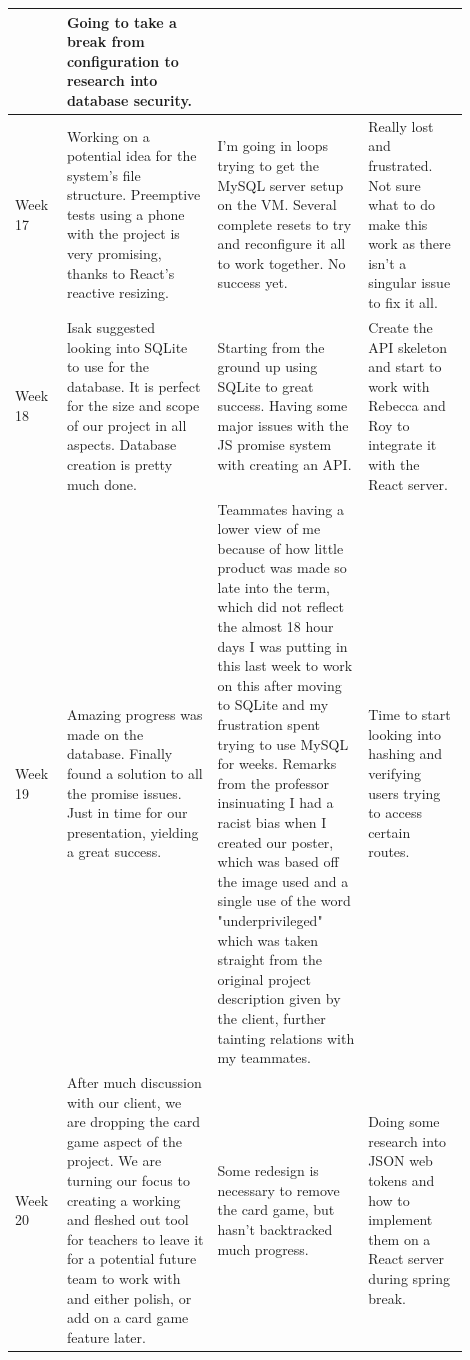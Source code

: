 \documentclass[draftclsnofoot,10pt,onecolumn]{IEEEtran}
\begin{document}
\begin{longtable}{p{0.1\linewidth}p{0.3\linewidth}p{0.3\linewidth}p{0.2\linewidth}}
            & Going to take a break from configuration to research into database security.\\
            \hline
            Week 17
            & Working on a potential idea for the system's file structure. Preemptive tests using a phone with the project is very promising, thanks to React's reactive resizing.
            & I'm going in loops trying to get the MySQL server setup on the VM. Several complete resets to try and reconfigure it all to work together. No success yet.
            & Really lost and frustrated. Not sure what to do make this work as there isn't a singular issue to fix it all. \\
            \hline
            Week 18
            & Isak suggested looking into SQLite to use for the database. It is perfect for the size and scope of our project in all aspects. Database creation is pretty much done.
            & Starting from the ground up using SQLite to great success. Having some major issues with the JS promise system with creating an API.
            & Create the API skeleton and start to work with Rebecca and Roy to integrate it with the React server. \\
            \hline
            Week 19
            & Amazing progress was made on the database. Finally found a solution to all the promise issues. Just in time for our presentation, yielding a great success.
            & Teammates having a lower view of me because of how little product was made so late into the term, which did not reflect the almost 18 hour days I was putting in this last week to work on this after moving to SQLite and my frustration spent trying to use MySQL for weeks. Remarks from the professor insinuating I had a racist bias when I created our poster, which was based off the image used and a single use of the word "underprivileged" which was taken straight from the original project description given by the client, further tainting relations with my teammates. 
            & Time to start looking into hashing and verifying users trying to access certain routes.\\
            \hline
            Week 20
            & After much discussion with our client, we are dropping the card game aspect of the project. We are turning our focus to creating a working and fleshed out tool for teachers to leave it for a potential future team to work with and either polish, or add on a card game feature later. 
            & Some redesign is necessary to remove the card game, but hasn't backtracked much progress.  
            & Doing some research into JSON web tokens and how to implement them on a React server during spring break.\\
        \end{longtable}
\newpage
\end{document}

